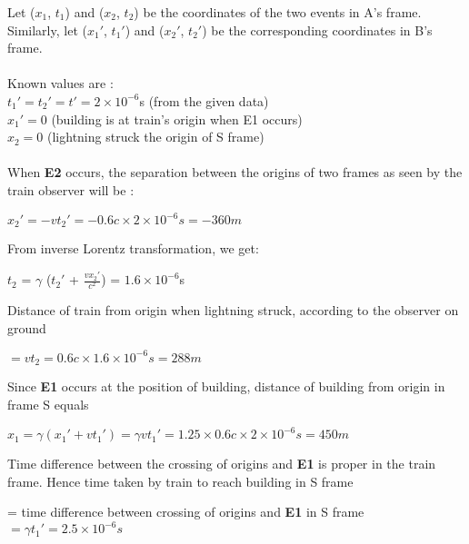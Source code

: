\documentclass[10pt, a4paper]{article}
\begin{document}
\begin{enumerate}
Let ($x_{1}$, $t_{1}$) and ($x_{2}$, $t_{2}$) be the coordinates of the two events in A's frame.\\
Similarly, let ($x_{1}'$, $t_{1}'$) and ($x_{2}'$, $t_{2}'$) be the corresponding coordinates in B's frame.\\
\\
Known values are : \\	
$t_{1}' = t_{2}' = t'=2\times10^{-6}$s \hfill (from the given data) \\
$x_{1}' = 0$ \hfill (building is at train's origin when E1 occurs) \\
$x_{2} = 0$ \hfill (lightning struck the origin of S frame) \\
\\
When {\bf E2} occurs, the separation between the origins of two frames as seen by the train observer will be : 
\begin{center}
$x_{2}' = -vt_{2}' = -0.6c\times2\times10^{-6}s = -360m$
\end{center}
From inverse Lorentz transformation, we get: 
\begin{center}
$t_{2}$ = $\gamma$ ($t_{2}'$ + $\frac{vx_{2}'}{c^{2}}$) = $1.6\times10^{-6}$s \\
\end{center}
Distance of train from origin when lightning struck, according to the observer on ground
\begin{center}
$= vt_{2} = 0.6c\times1.6\times10^{-6}s = 288m$
\end{center}
Since {\bf E1} occurs at the position of building, distance of building from origin in frame S equals
\begin{center}
$x_{1} = \gamma (x_{1}' + vt_{1}') = \gamma vt_{1}' = 1.25\times0.6c\times2\times10^{-6}s = 450m$
\end{center}
Time difference between the crossing of origins and {\bf E1} is proper in the train frame. Hence time taken by train to reach building in S frame
\begin{center}= time difference between crossing of origins and {\bf E1} in S frame \\
$ = \gamma t_{1}' = 2.5\times10^{-6}s$ 
\end{center}
\end{enumerate}
\end{document}
